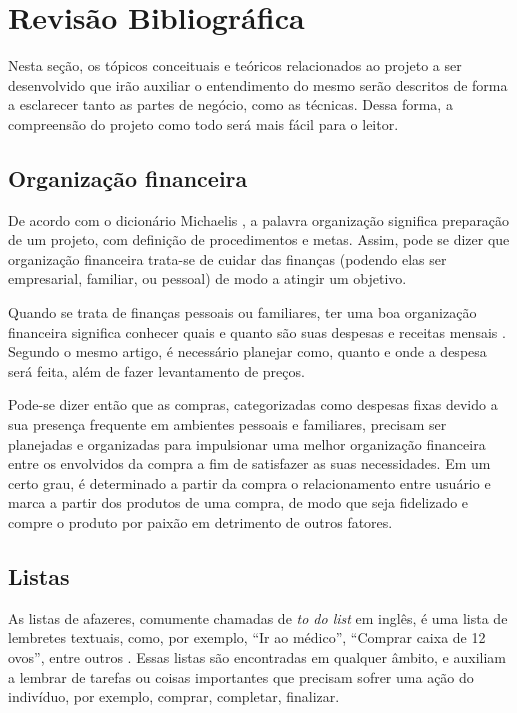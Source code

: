 \chapter{Revisão Bibliográfica}
Nesta seção, os tópicos conceituais e teóricos relacionados ao projeto a ser desenvolvido que irão auxiliar o entendimento do mesmo serão descritos de forma a esclarecer tanto as partes de negócio, como as técnicas. Dessa forma, a compreensão do projeto como todo será mais fácil para o leitor.

\section{Organização financeira}
De acordo com o dicionário Michaelis \cite{Michaelis}, a palavra organização significa preparação de um projeto, com definição de procedimentos e metas. Assim, pode se dizer que organização financeira trata-se de cuidar das finanças (podendo elas ser empresarial, familiar, ou pessoal) de modo a atingir um objetivo.

Quando se trata de finanças pessoais ou familiares, ter uma boa organização financeira significa conhecer quais e quanto são suas despesas e receitas mensais \cite{PlanejamentoFinanceiroFamiliar}. Segundo o mesmo artigo, é necessário planejar como, quanto e onde a despesa será feita, além de fazer levantamento de preços.

Pode-se dizer então que as compras, categorizadas como despesas fixas devido a sua presença frequente em ambientes pessoais e familiares, precisam ser planejadas e organizadas para impulsionar uma melhor organização financeira entre os envolvidos da compra a fim de satisfazer as suas necessidades. Em um certo grau, é determinado a partir da compra o relacionamento entre usuário e marca a partir dos produtos de uma compra, de modo que seja fidelizado e compre o produto por paixão em detrimento de outros fatores.

\section{Listas}
As listas de afazeres, comumente chamadas de \textit{to do list} em inglês, é uma lista de lembretes textuais, como, por exemplo, “Ir ao médico”, “Comprar caixa de 12 ovos”, entre outros \cite{Towel}. Essas listas são encontradas em qualquer âmbito, e auxiliam a lembrar de tarefas ou coisas importantes que precisam sofrer uma ação do indivíduo, por exemplo, comprar, completar, finalizar.

